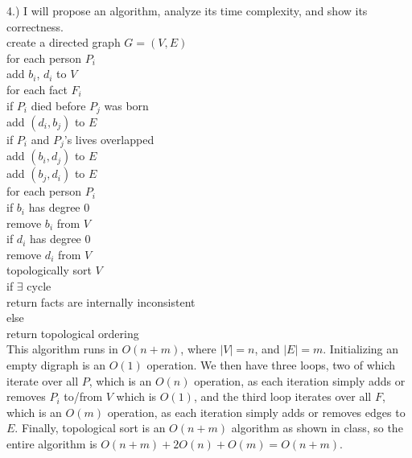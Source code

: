 \documentclass[12pt]{article}
\begin{document}
\pagebreak

4.) I will propose an algorithm, analyze its time complexity, and show its correctness.\\

create a directed graph $G = (V, E)$\\
for each person $P_i$\\
\hspace*{5mm} add $b_i$, $d_i$ to $V$\\
for each fact $F_i$\\
\hspace*{5mm} if $P_i$ died before $P_j$ was born\\
\hspace*{10mm} add $(d_i, b_j)$ to $E$\\
\hspace*{5mm} if $P_i$ and $P_j$'s lives overlapped\\
\hspace*{10mm} add $(b_i, d_j)$ to $E$\\
\hspace*{10mm} add $(b_j, d_i)$ to $E$\\
for each person $P_i$\\
\hspace*{5mm}if $b_i$ has degree $0$\\
\hspace*{10mm} remove $b_i$ from $V$\\
\hspace*{5mm}if $d_i$ has degree $0$\\
\hspace*{10mm} remove $d_i$ from $V$\\
topologically sort $V$\\
if $\exists$ cycle\\
\hspace*{5mm}return facts are internally inconsistent\\
else\\
\hspace*{5mm}return topological ordering\\

This algorithm runs in $O(n + m)$, where $|V| = n$, and $|E| = m$. Initializing an empty digraph is an $O(1)$ operation. We then have three loops, two of which iterate over all $P$, which is an $O(n)$ operation, as each iteration simply adds or removes $P_i$ to/from $V$ which is $O(1)$, and the third loop iterates over all $F$, which is an $O(m)$ operation, as each iteration simply adds or removes edges to $E$. Finally, topological sort is an $O(n + m)$ algorithm as shown in class, so the entire algorithm is $O(n + m) + 2O(n) + O(m) = O(n + m)$.\\
\end{document}
